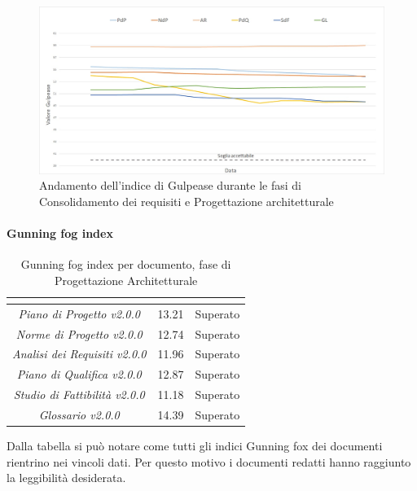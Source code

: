 \begin{figure} [H]
	\centering
	\includegraphics[scale=0.55]{Img/and_gulp_rp}
	\caption{Andamento dell'indice di Gulpease durante le fasi di Consolidamento dei requisiti e Progettazione architetturale}\label{immagine:gulpease rp}
\end{figure}

\pagebreak

\paragraph{Gunning fog index} \Spazio
\renewcommand{\arraystretch}{1.5}
\begin{table}[H]
	\begin{center}
		\begin{tabular}{|c|c|c|}
			\hline
			\rowcolor{title_row}
			\textbf{\color{title_text}{Documento}} & \textbf{\color{title_text}{Valore indice}} & \textbf{\color{title_text}{Esito}} \\
			\hline
			\emph{Piano di Progetto v2.0.0} & {13.21} & {Superato}\\
			\hline
			\emph{Norme di Progetto v2.0.0} & {12.74} & {Superato}\\
			\hline
			\emph{Analisi dei Requisiti v2.0.0} & {11.96} & {Superato}\\
			\hline
			\emph{Piano di Qualifica v2.0.0} & {12.87} & {Superato}\\
			\hline
			\emph{Studio di Fattibilità v2.0.0} & {11.18} & {Superato}\\
			\hline
			\emph{Glossario v2.0.0} & {14.39} & {Superato}\\
			\hline
		\end{tabular}
		\caption[Esiti verifica documenti, Consolidamento e Progettazione Architetturale]{Gunning fog index per documento, fase di Progettazione Architetturale}
		\label{tabella:verifica documenti gf}
	\end{center}
\end{table}
Dalla tabella si può notare come tutti gli indici Gunning fox dei documenti rientrino nei vincoli dati. Per questo motivo i documenti redatti hanno raggiunto la leggibilità desiderata.

